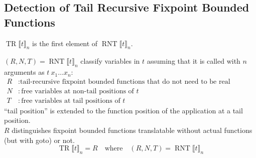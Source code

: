 \documentclass[a4paper,fleqn]{article}
\newcommand{\BRA}[1]{\llbracket #1 \rrbracket}
\DeclareMathOperator{\TRop}{TR}
\newcommand{\TR}[2]{\TRop\BRA{#1}_{#2}}
\DeclareMathOperator{\RNTop}{RNT}
\newcommand{\RNT}[2]{\RNTop\BRA{#1}_{#2}}
\newcommand{\kwgoto}{\mbox{\color{myviolet}\ttfamily goto}}
\begin{document}
\subsection{Detection of Tail Recursive Fixpoint Bounded Functions}\label{sec:tailrec-fixpoint-detection}
\raggedright
$\TR{t}{n}$ is the first element of $\RNT{t}{n}$.

$(R,N,T) = \RNT{t}{n}$ classify variables in $t$ assuming that it is called with $n$ arguments as $t\:x_1\ldots x_n$:
\begin{align*}
  R &: \text{tail-recursive fixpoint bounded functions that do not need to be real functions} \\
  N &: \text{free variables at non-tail positions of $t$} \\
  T &: \text{free variables at tail positions of $t$}
\end{align*}
``tail position'' is extended to the function position of the application at a tail position. \\
$R$ distinguishes fixpoint bounded functions translatable without actual functions (but with \kwgoto{}) or not.
\[ \TR{t}{n} = R \quad \text{where}\quad (R,N,T) = \RNT{t}{n} \]
\end{document}

